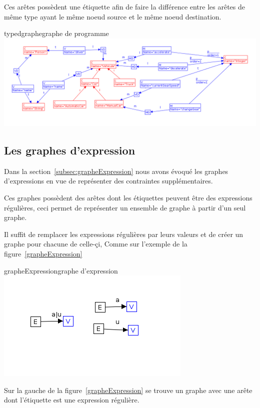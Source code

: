 \documentclass[a4paper, 12pt]{article}
\begin{document}
  Ces arêtes possèdent une étiquette afin de faire la différence entre les arêtes de même type ayant le même noeud source et le même noeud destination.

  \begin{myfig}{typedgraphe}{graphe de programme}
    \includegraphics[width=\textwidth]{typedGraph.png}
  \end{myfig}

  \subsection{Les graphes d'expression}

  Dans la section~\ref{subsec:grapheExpression} nous avons évoqué les graphes d'expressions en vue de représenter des contraintes supplémentaires.

  Ces graphes possèdent des arêtes dont les étiquettes peuvent être des expressions régulières, ceci permet de représenter un ensemble de graphe à partir d'un seul graphe.

  Il suffit de remplacer les expressions régulières par leurs valeurs et de créer un graphe pour chacune de celle-çi, Comme sur l'exemple de la figure~\ref{grapheExpression}

  \begin{myfig}{grapheExpression}{graphe d'expression}
    \includegraphics{graphExpression.png}
  \end{myfig}

  Sur la gauche de la figure~\ref{grapheExpression} se trouve un graphe avec une arête dont l'étiquette est une expression régulière.
\end{document}
